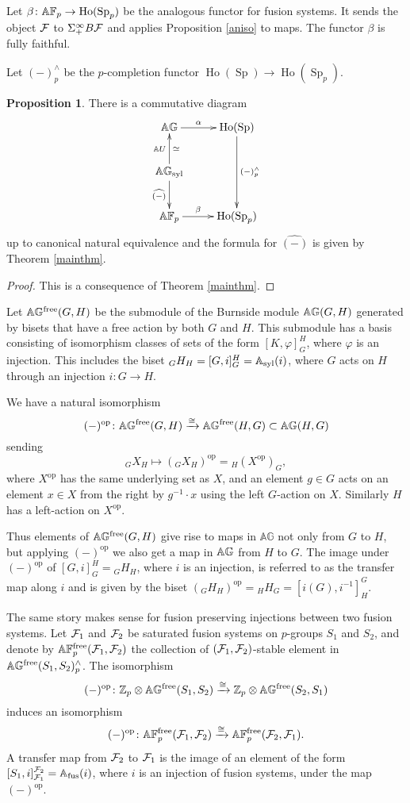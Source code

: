 \documentclass[10pt]{amsart}
\theoremstyle{definition}
\DeclareMathOperator{\Sp}{Sp}
\DeclareMathOperator{\Ho}{Ho}
\newtheorem{proposition}[theorem]{Proposition}
\renewcommand{\phi}{\varphi}
\begin{document}
Let $\beta \colon \AF \rightarrow \Ho(\Sp_p)$ be the analogous functor for fusion systems. It sends the object $\mathcal{F}$ to $\Sigma^{\infty}_{+} B \mathcal{F}$ and applies Proposition \ref{aniso} to maps. The functor $\beta$ is fully faithful.

Let $(-)^{\wedge}_{p}$ be the $p$-completion functor $\Ho(\Sp) \rightarrow \Ho(\Sp_p)$.

\begin{proposition}
There is a commutative diagram
\[
\xymatrix{\AG \ar[r]^-{\al}& \Ho(\Sp) \ar[dd]^-{(-)^{\wedge}_{p}} \\ \AGs \ar[u]^-{\AU}_-{\simeq}  \ar[d]_-{\widehat{(-)}} &  \\ \AF \ar[r]^-{\beta} & \Ho(\Sp_p)}
\]
up to canonical natural equivalence and the formula for $\widehat{(-)}$ is given by Theorem \ref{mainthm}.
\end{proposition}
\begin{proof}
This is a consequence of Theorem \ref{mainthm}.
\end{proof}

Let $\mathbb{A} \mathbb{G}^{\mathrm{free}}(G,H)$ be the submodule of the Burnside module $\mathbb{A} \mathbb{G}(G,H)$ generated by bisets that have a free action by both $G$ and $H$. This submodule has a basis consisting of isomorphism classes of sets of the form $[K,\phi]_{G}^{H}$, where $\phi$ is an injection. This includes the biset  ${}_G H_H = [G,i]_{G}^{H} = \mathbb{A}_{\mathrm{syl}}(i)$, where $G$ acts on $H$ through an injection $i \colon G \to H$.

We have a natural isomorphism
\[
(-)^{\mathrm{op}} \colon \mathbb{A} \mathbb{G}^{\mathrm{free}}(G,H) \xrightarrow{\cong} \mathbb{A} \mathbb{G}^{\mathrm{free}}(H,G) \subset \mathbb{A} \mathbb{G}(H,G)
\]
sending
\[
{}_G X_H \mapsto ({}_G X_H)^{\mathrm{op}} = {}_H (X^{\mathrm{op}})_G,
\]
where $X^{\mathrm{op}}$ has the same underlying set as $X$, and an element $g\in G$ acts on an element $x\in X$ from the right by $g^{-1}\cdot x$ using the left $G$-action on $X$. Similarly $H$ has a left-action on $X^{\mathrm{op}}$.

Thus elements of $\mathbb{A} \mathbb{G}^{\mathrm{free}}(G,H)$ give rise to maps in $\mathbb{AG}$ not only from $G$ to $H$, but applying $(-)^{\mathrm{op}}$ we also get a map in $\mathbb{A} \mathbb{G}$ from $H$ to $G$. The image under $(-)^{\mathrm{op}}$ of $[G,i]_{G}^{H} = {}_G H_H$, where $i$ is an injection, is referred to as the transfer map along $i$ and is given by the biset $({}_G H_H)^{\mathrm{op}} = {}_H H_G = [i(G), i^{-1}]_H^G$.

The same story makes sense for fusion preserving injections between two fusion systems. Let $\mathcal{F}_1$ and $\mathcal{F}_2$ be saturated fusion systems on $p$-groups $S_1$ and $S_2$, and denote by $\mathbb{A} \mathbb{F}_p^{\mathrm{free}}(\mathcal{F}_1,\mathcal{F}_2)$ the collection of $(\mathcal{F}_1,\mathcal{F}_2)$-stable element in $\mathbb{A} \mathbb{G}^{\mathrm{free}}(S_1,S_2)^{\wedge}_p$. The isomorphism
\[
(-)^{\mathrm{op}} \colon \mathbb{Z}_p \otimes \mathbb{A} \mathbb{G}^{\mathrm{free}}(S_1,S_2) \xrightarrow{\cong} \mathbb{Z}_p \otimes \mathbb{A} \mathbb{G}^{\mathrm{free}}(S_2,S_1)
\]
induces an isomorphism
\[
(-)^{\mathrm{op}} \colon \mathbb{A} \mathbb{F}_p^{\mathrm{free}}(\mathcal{F}_1,\mathcal{F}_2) \xrightarrow{\cong} \mathbb{A} \mathbb{F}_p^{\mathrm{free}}(\mathcal{F}_2,\mathcal{F}_1).
\]
A transfer map from $\mathcal{F}_2$ to $\mathcal{F}_1$ is the image of an element of the form $[S_1,i]_{\mathcal{F}_1}^{\mathcal{F}_2} = \mathbb{A}_{\text{fus}}(i)$, where $i$ is an injection of fusion systems, under the map $(-)^{\mathrm{op}}$.
\end{document}
